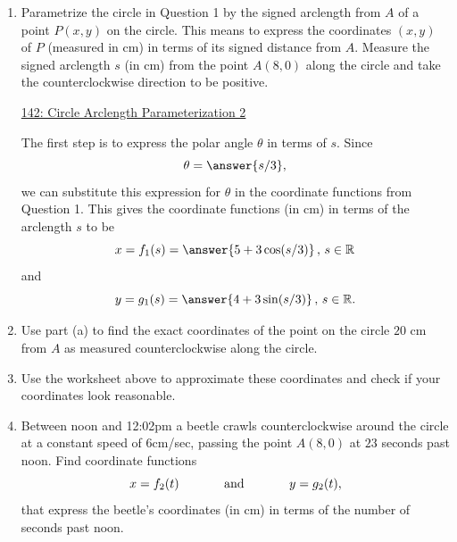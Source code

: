\documentclass{ximera}
\begin{document}
\begin{question}  \label{QDF09555dfdfLKDD}
\begin{enumerate}

\item Parametrize the circle in Question 1 by the signed arclength from $A$ of a point $P(x,y)$ on the circle. This means to express the coordinates $(x,y)$ of $P$ (measured in cm) in terms of its signed distance from $A$. Measure the signed arclength $s$ (in cm)  from the point $A(8,0)$ along the circle and take the counterclockwise direction to be positive. 

\begin{onlineOnly}
    \begin{center}
\end{center}
\end{onlineOnly}

\href{https://www.desmos.com/calculator/pubvk2lmci}{142: Circle Arclength Parameterization 2}

The first step is to express the polar angle $\theta$ in terms of $s$. Since
\[
  \theta = \answer{s/3},
\]
we can substitute this expression for $\theta$ in the coordinate functions from Question 1. This gives the coordinate functions (in cm) in terms of the arclength $s$ to be
\[
  x = f_1(s) = \answer{5 + 3 \cos(s/3)} \, , \, s\in \mathbb{R}
\]
and
\[
   y = g_1(s) = \answer{4 + 3 \sin(s/3)} \, , \, s\in \mathbb{R} .
\]

\item Use part (a) to find the exact coordinates of the point on the circle  $20$ cm from $A$ as measured counterclockwise along the circle. 

\item Use the worksheet above to approximate these coordinates and check if your coordinates look reasonable.

\item Between noon and 12:02pm a beetle crawls counterclockwise around the circle at a constant speed of $6$cm/sec, passing the point $A(8,0)$ at $23$ seconds past noon. Find coordinate functions
\[
   x = f_2(t)  \hskip 0.5 in \text{and} \hskip 0.5in  y=g_2(t) ,
\] 
that express the beetle's coordinates (in cm) in terms of the number of seconds past noon.

\end{enumerate}
\end{question}
\end{document}
